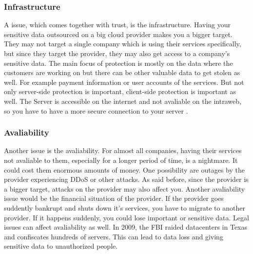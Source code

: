 \subsubsection{Infrastructure}
A issue, which comes together with trust, is the infrastructure. Having your sensitive data outsourced on a big cloud provider makes you a bigger target. They may not target a single company which is using their services specifically, but since they target the provider, they may also get access to a company's sensitive data. 
The main focus of protection is mostly on the data where the customers are working on but there can be other valuable data to get stolen as well. For example payment information or user accounts of the services. 
But not only server-side protection is important, client-side protection is important as well. The Server is accessible on the internet and not avaliable on the intraweb, so you have to have a more secure connection to your server \cite{hooks}.


\subsubsection{Avaliability}
Another issue is the avaliability. For almost all companies, having their services not avaliable to them, especially for a longer period of time, is a nightmare. It could cost them enormous amounts of money. One possibility are outages by the provider experiencing DDoS or other attacks. As said before, since the provider is a bigger target, attacks on the provider may also affect you. Another avaliability issue would be the financial situation of the provider. If the provider goes  suddently bankrupt and shuts down it's services, you have to migrate to another provider. If it happens suddenly, you could lose important or sensitive data. 
Legal issues can affect avaliability as well. In 2009, the FBI raided datacenters in Texas and confiscates hundreds of servers. \cite{fbi_raid} This can lead to data loss and giving sensitive data to unauthorized people. 

